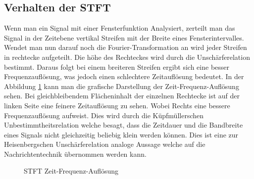 \subsection{Verhalten der STFT}

Wenn man ein Signal mit einer Fensterfunktion Analysiert, zerteilt man das Signal in der Zeitebene vertikal Streifen mit der Breite eines Fensterintervalles. Wendet man nun darauf noch die Fourier-Transformation an wird jeder Streifen in rechtecke aufgeteilt. Die höhe des Rechteckes wird durch die Unschärferelation bestimmt. Daraus folgt bei einem breiteren Streifen ergibt sich eine besser Frequenzauflösung, was jedoch einen schlechtere Zeitauflösung bedeutet. In der Abbildung \ref{fig:stftauf} kann man die grafische Darstellung der Zeit-Frequenz-Auflösung sehen. Bei gleichbleibendem Flächeninhalt der einzelnen Rechtecke ist auf der linken Seite eine feinere Zeitauflösung zu sehen. Wobei Rechts eine bessere Frequenzauflösung aufweist. Dies wird durch die Küpfmüllerschen Unbestimmtheitsrelation welche besagt, dass die Zeitdauer und die Bandbreite eines Signals nicht gleichzeitig beliebig klein werden können. Dies ist eine zur Heisenbergschen Unschärferelation analoge Aussage welche auf die Nachrichtentechnik übernommen werden kann.

\begin{figure}[!ht]
	\centering
	\caption{STFT Zeit-Frequenz-Auflösung}\label{fig:stftauf}	
\end{figure}

